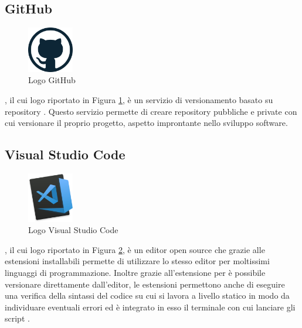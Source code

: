 \subsection{GitHub}
\begin{figure}[H]
	\begin{center} \includegraphics[width=2cm]{figures/github-logo}
		\caption[Logo GitHub]{Logo GitHub}  
		\label{logo_github} 
	\end{center}
\end{figure}
, il cui logo riportato in Figura \ref{logo_github}, è un servizio di versionamento basato su repository . Questo servizio permette di creare repository pubbliche e private con cui versionare il proprio progetto, aspetto improntante nello sviluppo software.

\subsection{Visual Studio Code}
\begin{figure}[H]
	\begin{center} \includegraphics[width=2cm]{figures/Visual_Studio_code}
		\caption[Logo Visual Studio Code]{Logo Visual Studio Code}
		\label{logo_vsc} 
	\end{center}
\end{figure}
, il cui logo riportato in Figura \ref{logo_vsc}, è un editor open source che grazie alle estensioni installabili permette di utilizzare lo stesso editor per moltissimi linguaggi di programmazione. Inoltre grazie all'estensione per  è possibile versionare direttamente dall'editor, le estensioni permettono anche di eseguire una verifica della sintassi del codice su cui si lavora a livello statico in modo da individuare eventuali errori ed è integrato in esso il terminale con cui lanciare gli script .

